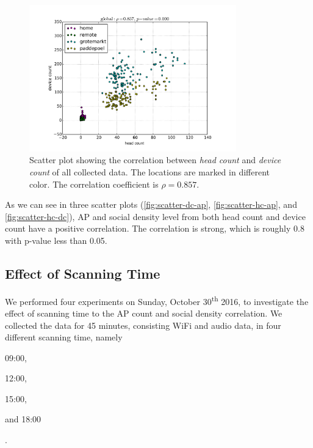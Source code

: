 	\begin{figure}[H]
		\centering
		\includegraphics[width=0.8\textwidth]{./img/result/global-gt-vs-pr}
		\caption[Scatter plot of head and device count.]
		{Scatter plot showing the correlation between \textit{head count} and \textit{device count} of all collected data. The locations are marked in different color. The correlation coefficient is $\rho=0.857$.}
		\label{fig:scatter-hc-dc}
	\end{figure}

	As we can see in three scatter plots (\autoref{fig:scatter-dc-ap}, \autoref{fig:scatter-hc-ap}, and \autoref{fig:scatter-hc-dc}), \ac{AP} and social density level from both head count and device count have a positive correlation. The correlation is strong, which is roughly 0.8 with p-value less than 0.05. 






	\subsection{Effect of Scanning Time} %
	\label{sub:effect_of_scanning_time}
	We performed four experiments on Sunday, October 30\textsuperscript{th} 2016, to investigate the effect of scanning time to the \ac{AP} count and social density correlation. We collected the data for 45 minutes, consisting WiFi and audio data, in four different scanning time, namely
	\begin{enumerate*}[label={\alph*)},font={\color{red!50!black}\bfseries}]
	  \item 09:00,
	  \item 12:00,
	  \item 15:00,
	  \item and 18:00
	\end{enumerate*}.
	
